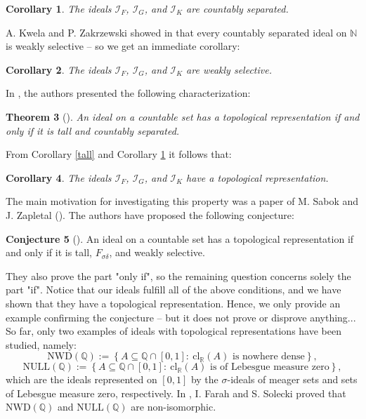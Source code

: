 \documentclass{amsart}
\newtheorem{thm}{Theorem}[section]
\newtheorem{cor}[thm]{Corollary}
\theoremstyle{definition}
\newtheorem{conj}[thm]{Conjecture}
\newcommand{\N}{{\mathbb N}}
\newcommand{\R}{{\mathbb R}}
\newcommand{\Q}{{\mathbb Q}}
\newcommand{\I}{\mathcal I}
\newcommand{\NULL}{\mathrm{NULL}}
\newcommand{\NWD}{\mathrm{NWD}}
\newcommand{\cl}{\mathrm{cl}}
\begin{document}
\begin{cor} \label{cs}
The ideals $\I_F$, $\I_G$, and $\I_K$ are countably separated.
\end{cor}

A. Kwela and P. Zakrzewski showed in \cite[Proposition 4.3]{KwelaZak} that every countably separated ideal on $\N$ is weakly selective -- so we get an immediate corollary:

\begin{cor}
The ideals $\I_F$, $\I_G$, and $\I_K$ are weakly selective.
\end{cor}


In \cite{Adas}, the authors presented the following characterization: 

\begin{thm}[{\cite[Theorem 1.1]{Adas}}]
An ideal on a countable set has a topological representation if and only if it is tall and countably separated.
\end{thm}

From Corollary \ref{tall} and Corollary \ref{cs} it follows that:

\begin{cor}
The ideals $\I_F$, $\I_G$, and $\I_K$ have a topological representation.
\end{cor}

The main motivation for investigating this property was a paper of M. Sabok and J. Zapletal (\cite{Sabok}). The authors have proposed the following conjecture:

\begin{conj}[\cite{Sabok}]
An ideal on a countable set has a topological representation if and only if it is tall, $F_{\sigma\delta}$, and weakly selective. 
\end{conj}

They also prove the part "only if", so the remaining question concerns solely the part "if".
Notice that our ideals fulfill all of the above conditions, and we have shown that they have a topological representation. Hence, we only provide an example confirming the conjecture -- but it does not prove or disprove anything...\\


So far, only two examples of ideals with topological representations have been studied, namely:
$$\NWD(\Q):=\left\{A\subseteq\mathbb{Q}\cap [0,1] :\ \cl_\R(A) \textrm{ is nowhere dense}\right\},$$
$$\NULL(\Q):=\left\{A\subseteq\mathbb{Q}\cap [0,1] :\ \cl_\R(A) \textrm{ is of Lebesgue measure zero}\right\},$$
which are the ideals represented on $[0,1]$ by the $\sigma$-ideals of meager sets and sets of Lebesgue measure zero, respectively. In \cite{FS}, I. Farah and S. Solecki proved that $\NWD(\Q)$ and $\NULL(\Q)$ are non-isomorphic.
\end{document}
